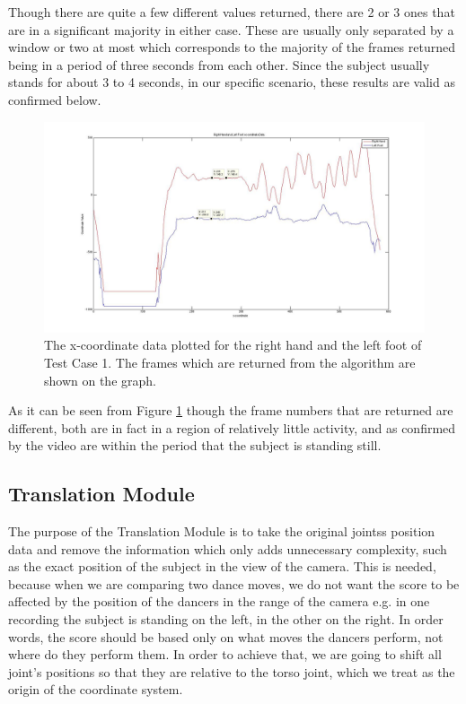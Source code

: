 \documentclass[11pt,a4paper]{article}
\begin{document}
\noindent
Though there are quite a few different values returned, there are 2 or 3 ones that are in a significant majority in either case. These are usually only separated by a window or two at most which corresponds to the majority of the frames returned being in a period of three seconds from each other. Since the subject usually stands for about 3 to 4 seconds, in our specific scenario, these results are valid as confirmed below.
\begin{figure}[h]
\center
\includegraphics[scale=0.2]{Motionless_R_Hand_L_Foot_X.jpg} 
\caption{The x-coordinate data plotted for the right hand and the left foot of Test Case 1. The frames which are returned from the algorithm are shown on the graph.}
\label{motionless_rh_lf}
\end{figure}
 
\noindent
As it can be seen from Figure \ref{motionless_rh_lf} though the frame numbers that are returned are different, both are in fact in a region of relatively little activity, and as confirmed by the video are within the period that the subject is standing still. 

\clearpage
\subsection{Translation Module}
\noindent
The purpose of the Translation Module is to take the original jointss position data and remove the information which only adds unnecessary complexity, such as the exact position of the subject in the view of the camera. This is needed, because when we are comparing two dance moves, we do not want the score to be affected by the position of the dancers in the range of the camera e.g. in one recording the subject is standing on the left, in the other on the right. In order words, the score should be based only on what moves the dancers perform, not where do they perform them. In order to achieve that, we are going to shift all joint's positions so that they are relative to the torso joint, which we treat as the origin of the coordinate system.
\end{document}
